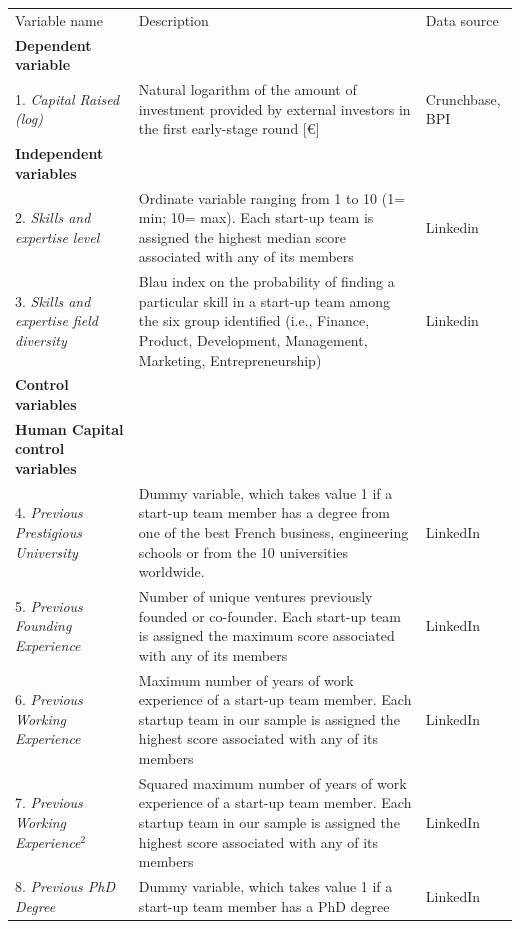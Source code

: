 \documentclass[12pt]{article}
\begin{document}
\begin{table} [ht]
\scriptsize
\renewcommand{\arraystretch}{1.5}
\begin{tabularx}{\textwidth}{ p{5cm} p{7cm} p{2.2cm} }
\toprule
\multicolumn{1}{l}{Variable name}&\multicolumn{1}{l}{Description}&\multicolumn{1}{l}{Data source}\\
\cmidrule(r){1-3}
\textbf{Dependent variable}& &\\
1. \textit{Capital Raised (log)} & Natural logarithm of the amount of investment provided by external investors in the first early-stage round [€] & Crunchbase, BPI \\
\cmidrule(r){2-3}
\textbf{Independent variables}& &\\
2. \textit{Skills and expertise level} & Ordinate variable ranging from 1 to 10 (1= min; 10= max). Each start-up team is assigned the highest median score associated with any of its members & Linkedin\\
3. \textit{Skills and expertise field diversity} & Blau index on the probability of finding a particular skill in a start-up team among the six group identified (i.e., Finance, Product, Development, Management, Marketing, Entrepreneurship) & Linkedin \\
\cmidrule(r){2-3}
\textbf{Control variables}& &\\
\textbf{Human Capital control variables}& &\\
4. \textit{Previous Prestigious University} & Dummy variable, which takes value 1 if a start-up team member has a degree from one of the best French business, engineering schools or from the 10 universities worldwide. & LinkedIn\\
5. \textit{Previous Founding Experience} & Number of unique ventures previously founded or co-founder. Each start-up team is assigned the maximum score associated with any of its members & LinkedIn\\
6. \textit{Previous Working Experience} & Maximum number of years of work experience of a start-up team member. Each startup team in our sample is assigned the highest score associated with any of its members & LinkedIn\\
7. \textit{Previous Working Experience$^2$} & Squared maximum number of years of work experience of a start-up team member. Each startup team in our sample is assigned the highest score associated with any of its members & LinkedIn\\
8. \textit{Previous PhD Degree} & Dummy variable, which takes value 1 if a start-up team member has a PhD degree & LinkedIn\\

\end{tabularx}
\end{table}
\end{document}
